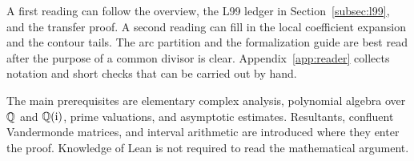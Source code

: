 A first reading can follow the overview, the L99 ledger in
Section~\ref{subsec:l99}, and the transfer proof. A second reading
can fill in the local coefficient expansion and the contour tails.
The arc partition and the formalization guide are best read after
the purpose of a common divisor is clear. Appendix~\ref{app:reader}
collects notation and short checks that can be carried out by hand.

The main prerequisites are elementary complex analysis, polynomial
algebra over \(\mathbb Q\) and \(\mathbb Q(\mathrm{i})\), prime valuations, and
asymptotic estimates. Resultants, confluent Vandermonde matrices,
and interval arithmetic are introduced where they enter the proof.
Knowledge of Lean is not required to read the mathematical argument.
